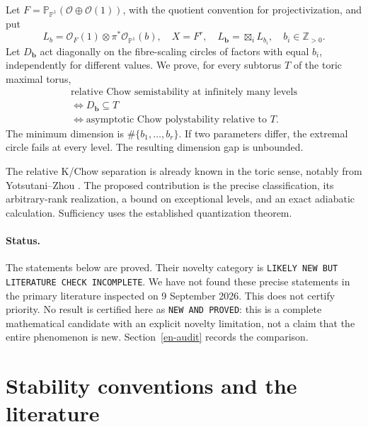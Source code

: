 \documentclass[12pt]{amsart}
\theoremstyle{definition}
\theoremstyle{remark}
\numberwithin{equation}{section}
\newcommand{\cO}{\mathcal{O}}
\newcommand{\Z}{\mathbb{Z}}
\newcommand{\mP}{\mathbb{P}}
\begin{document}
Let $F=\mP_{\mP^1}(\cO\oplus\cO(1))$, with the quotient convention for projectivization, and put
\begin{equation}\label{en-family}
 L_b=\cO_F(1)\otimes\pi^*\cO_{\mP^1}(b),\quad
 X=F^r,\quad L_{\boldsymbol b}=\boxtimes_iL_{b_i},\quad b_i\in\Z_{>0}.
\end{equation}
Let $D_{\boldsymbol b}$ act diagonally on the fibre-scaling circles of factors with equal $b_i$, independently for different values. We prove, for every subtorus $T$ of the toric maximal torus,
\begin{equation}\label{en-intro}
\begin{gathered}
\text{relative Chow semistability at infinitely many levels}\\
\Longleftrightarrow D_{\boldsymbol b}\subseteq T\\
\Longleftrightarrow\text{asymptotic Chow polystability relative to }T.
\end{gathered}
\end{equation}
The minimum dimension is $\#\{b_1,\ldots,b_r\}$. If two parameters differ, the extremal circle fails at every level. The resulting dimension gap is unbounded.

The relative K/Chow separation is already known in the toric sense, notably from Yotsutani--Zhou \cite{en-YZ}. The proposed contribution is the precise classification, its arbitrary-rank realization, a bound on exceptional levels, and an exact adiabatic calculation. Sufficiency uses the established quantization theorem.

\paragraph{Status.}
The statements below are proved. Their novelty category is
\texttt{LIKELY NEW BUT LITERATURE CHECK INCOMPLETE}.
We have not found these precise statements in the primary literature inspected on 9 September 2026. This does not certify priority. No result is certified here as \texttt{NEW AND PROVED}: this is a complete mathematical candidate with an explicit novelty limitation, not a claim that the entire phenomenon is new. Section~\ref{en-audit} records the comparison.

\section{Stability conventions and the literature}
\end{document}
